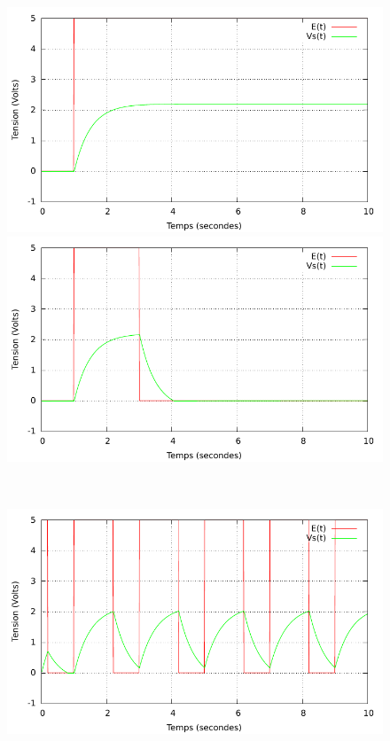 \documentclass[a4paper,11pt]{article}
\begin{document}
  \begin{figure}[h!]
   \begin{minipage}[b]{0.5\linewidth}
      \centering \includegraphics[scale=0.68]{CBechelon.pdf}
   \end{minipage}\hfill
   \begin{minipage}[b]{0.5\linewidth}   
      \centering \includegraphics[scale=.68]{CBporte.pdf}
   \end{minipage}\\
    \begin{minipage}[b]{0.5\linewidth}   
      \centering \includegraphics[scale=.68]{CBcarre.pdf}

\end{minipage}
\end{figure}
\end{document}
